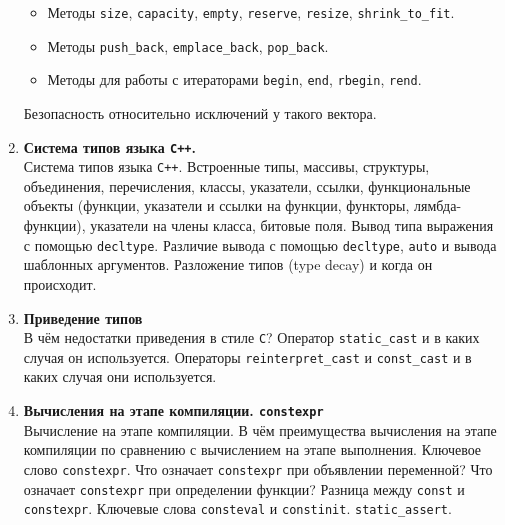 \documentclass{article}
\begin{document}
\begin{enumerate}
\begin{itemize}
\item Методы \texttt{size}, \texttt{capacity}, \texttt{empty}, \texttt{reserve}, \texttt{resize}, \texttt{shrink\_to\_fit}.
\item Методы \texttt{push\_back}, \texttt{emplace\_back}, \texttt{pop\_back}.

\item Методы для работы с итераторами \texttt{begin}, \texttt{end}, \texttt{rbegin}, \texttt{rend}.
\end{itemize}

Безопасность относительно исключений у такого вектора.




\item \textbf{Система типов языка \texttt{C++}.}\\
Система типов языка \texttt{C++}. Встроенные типы, массивы, структуры, объединения, перечисления, классы, указатели, ссылки, функциональные объекты (функции, указатели и ссылки на функции, функторы, лямбда-функции), указатели на члены класса, битовые поля. Вывод типа выражения с помощью \texttt{decltype}. Различие вывода с помощью \texttt{decltype}, \texttt{auto} и вывода шаблонных аргументов. Разложение типов (type decay) и когда он происходит.


\item \textbf{Приведение типов}\\
В чём недостатки приведения в стиле \texttt{C}? Оператор \texttt{static\_cast} и в каких случая он используется. Операторы \texttt{reinterpret\_cast} и \texttt{const\_cast} и в каких случая они используется. 




\item \textbf{Вычисления на этапе компиляции. \texttt{constexpr}} \\
Вычисление на этапе компиляции. В чём преимущества вычисления на этапе компиляции по сравнению с вычислением на этапе выполнения.  Ключевое слово \texttt{constexpr}. Что означает \texttt{constexpr} при объявлении переменной? Что означает \texttt{constexpr} при определении функции? Разница между \texttt{const} и \texttt{constexpr}. Ключевые слова \texttt{consteval} и \texttt{constinit}. \texttt{static\_assert}.



\end{enumerate}
\end{document}
